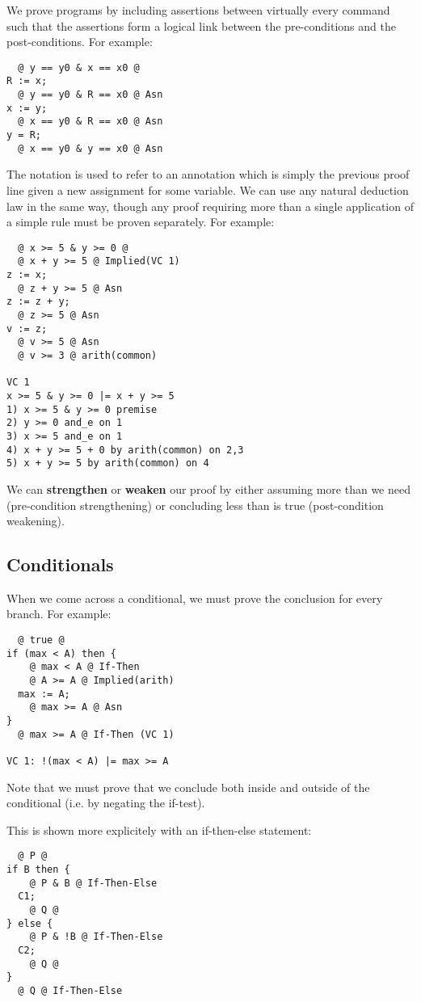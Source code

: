 \documentclass[12pt]{article}
\begin{document}
We prove programs by including assertions between virtually every command such that the assertions form a logical link between the pre-conditions and the post-conditions. For example:
\begin{verbatim}
  @ y == y0 & x == x0 @
R := x;
  @ y == y0 & R == x0 @ Asn
x := y;
  @ x == y0 & R == x0 @ Asn
y = R;
  @ x == y0 & y == x0 @ Asn
\end{verbatim}

The notation  is used to refer to an annotation which is simply the previous proof line given a new assignment for some variable. We can use any natural deduction law in the same way, though any proof requiring more than a single application of a simple rule must be proven separately. For example:

\begin{verbatim}
  @ x >= 5 & y >= 0 @
  @ x + y >= 5 @ Implied(VC 1)
z := x;
  @ z + y >= 5 @ Asn
z := z + y;
  @ z >= 5 @ Asn
v := z;
  @ v >= 5 @ Asn
  @ v >= 3 @ arith(common)

VC 1
x >= 5 & y >= 0 |= x + y >= 5
1) x >= 5 & y >= 0 premise
2) y >= 0 and_e on 1
3) x >= 5 and_e on 1
4) x + y >= 5 + 0 by arith(common) on 2,3
5) x + y >= 5 by arith(common) on 4
\end{verbatim}

We can {\bf strengthen} or {\bf weaken} our proof by either assuming more than we need (pre-condition strengthening) or concluding less than is true (post-condition weakening).

\subsection*{Conditionals}
When we come across a conditional, we must prove the conclusion for every branch. For example:
\begin{verbatim}
  @ true @
if (max < A) then {
    @ max < A @ If-Then
    @ A >= A @ Implied(arith)
  max := A;
    @ max >= A @ Asn
}
  @ max >= A @ If-Then (VC 1)

VC 1: !(max < A) |= max >= A
\end{verbatim}
Note that we must prove that we conclude  both inside and outside of the conditional (i.e. by negating the if-test).

This is shown more explicitely with an if-then-else statement:
\begin{verbatim}
  @ P @
if B then {
    @ P & B @ If-Then-Else
  C1;
    @ Q @
} else {
    @ P & !B @ If-Then-Else
  C2;
    @ Q @
}
  @ Q @ If-Then-Else
\end{verbatim}
\end{document}
